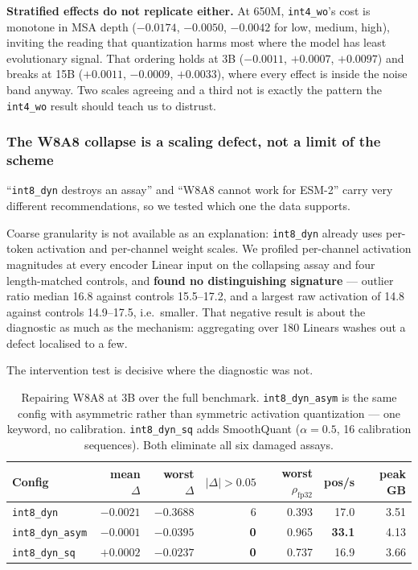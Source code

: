 \documentclass[11pt]{article}
\newcommand{\cfg}[1]{\texttt{#1}}
\begin{document}
\textbf{Stratified effects do not replicate either.} At 650M, \cfg{int4\_wo}'s
cost is monotone in MSA depth ($-0.0174$, $-0.0050$, $-0.0042$ for low, medium,
high), inviting the reading that quantization harms most where the model has
least evolutionary signal. That ordering holds at 3B ($-0.0011$, $+0.0007$,
$+0.0097$) and breaks at 15B ($+0.0011$, $-0.0009$, $+0.0033$), where every
effect is inside the noise band anyway. Two scales agreeing and a third not is
exactly the pattern the \cfg{int4\_wo} result should teach us to distrust.

\subsubsection{The W8A8 collapse is a scaling defect, not a limit of the scheme}
\label{sec:w8a8fix}

``\cfg{int8\_dyn} destroys an assay'' and ``W8A8 cannot work for ESM-2'' carry
very different recommendations, so we tested which one the data supports.

Coarse granularity is not available as an explanation: \cfg{int8\_dyn} already
uses per-token activation and per-channel weight scales. We profiled
per-channel activation magnitudes at every encoder Linear input on the
collapsing assay and four length-matched controls, and \textbf{found no
distinguishing signature} --- outlier ratio median 16.8 against controls
15.5--17.2, and a largest raw activation of 14.8 against controls 14.9--17.5,
i.e.\ smaller. That negative result is about the diagnostic as much as the
mechanism: aggregating over 180 Linears washes out a defect localised to a few.

The intervention test is decisive where the diagnostic was not.

\begin{table}[htb]
\centering
\caption{Repairing W8A8 at 3B over the full benchmark. \cfg{int8\_dyn\_asym} is
the same config with asymmetric rather than symmetric activation quantization
--- one keyword, no calibration. \cfg{int8\_dyn\_sq} adds SmoothQuant
($\alpha = 0.5$, 16 calibration sequences). Both eliminate all six damaged
assays.}
\label{tab:w8a8}
\small
\begin{tabular}{lrrrrrr}
\toprule
Config & mean $\Delta$ & worst $\Delta$ & $|\Delta|>0.05$ & worst $\rho_{\text{fp32}}$ & pos/s & peak GB \\
\midrule
\cfg{int8\_dyn}       & $-0.0021$ & $\mathbf{-0.3688}$ & 6 & 0.393 & 17.0 & 3.51 \\
\cfg{int8\_dyn\_asym} & $-0.0001$ & $-0.0395$ & \textbf{0} & 0.965 & \textbf{33.1} & 4.13 \\
\cfg{int8\_dyn\_sq}   & $+0.0002$ & $\mathbf{-0.0237}$ & \textbf{0} & 0.737 & 16.9 & 3.66 \\
\bottomrule
\end{tabular}
\end{table}
\end{document}
